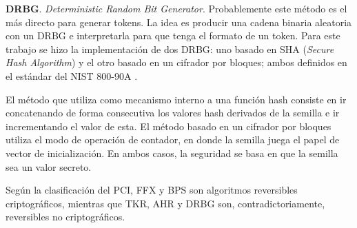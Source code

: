 \textbf{DRBG}. \textit{Deterministic Random Bit Generator}. Probablemente este
método es el más directo para generar tokens. La idea es producir una cadena
binaria aleatoria con un DRBG e interpretarla para que tenga el formato de un
token. Para este trabajo se hizo la implementación de dos DRBG: uno basado en
SHA (\textit{Secure Hash Algorithm}) y el otro basado en un cifrador por
bloques; ambos definidos en el estándar del NIST 800-90A \cite{nist_aleatorios}.

El método que utiliza como mecanismo interno a una función hash consiste en ir
concatenando de forma consecutiva los valores hash derivados de la semilla e ir
incrementando el valor de esta. El método basado en un cifrador por bloques
utiliza el modo de operación de contador, en donde la semilla juega el papel de
vector de inicialización. En ambos casos, la seguridad se basa en que la semilla
sea un valor secreto.

Según la clasificación del PCI, FFX y BPS son algoritmos reversibles
criptográficos, mientras que TKR, AHR y DRBG son, contradictoriamente,
reversibles no criptográficos.

